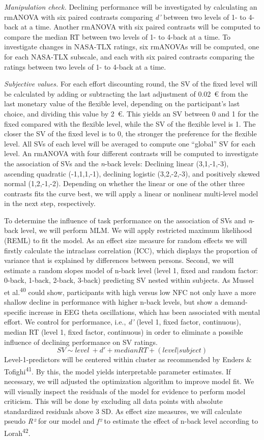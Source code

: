 \documentclass[
  man,floatsintext]{apa6}
\begin{document}
\emph{Manipulation check.}
Declining performance will be investigated by calculating an rmANOVA with six paired contrasts comparing \emph{d'} between two levels of 1- to 4-back at a time.
Another rmANOVA with six paired contrasts will be computed to compare the median RT between two levels of 1- to 4-back at a time.
To investigate changes in NASA-TLX ratings, six rmANOVAs will be computed, one for each NASA-TLX subscale, and each with six paired contrasts comparing the ratings between two levels of 1- to 4-back at a time.

\emph{Subjective values.}
For each effort discounting round, the SV of the fixed level will be calculated by adding or subtracting the last adjustment of 0.02~€ from the last monetary value of the flexible level, depending on the participant's last choice, and dividing this value by 2~€.
This yields an SV between 0 and 1 for the fixed compared with the flexible level, while the SV of the flexible level is 1.
The closer the SV of the fixed level is to 0, the stronger the preference for the flexible level.
All SVs of each level will be averaged to compute one ``global'' SV for each level.
An rmANOVA with four different contrasts will be computed to investigate the association of SVs and the \emph{n}-back levels: Declining linear (3,1,-1,-3), ascending quadratic (-1,1,1,-1), declining logistic (3,2,-2,-3), and positively skewed normal (1,2,-1,-2).
Depending on whether the linear or one of the other three contrasts fits the curve best, we will apply a linear or nonlinear multi-level model in the next step, respectively.

To determine the influence of task performance on the association of SVs and \emph{n}-back level, we will perform MLM.
We will apply restricted maximum likelihood (REML) to fit the model.
As an effect size measure for random effects we will firstly calculate the intraclass correlation (ICC), which displays the proportion of variance that is explained by differences between persons.
Second, we will estimate a random slopes model of n-back level (level 1, fixed and random factor: 0-back, 1-back, 2-back, 3-back) predicting SV nested within subjects.
As Mussel et al.\textsuperscript{40} could show, participants with high versus low NFC not only have a more shallow decline in performance with higher n-back levels, but show a demand-specific increase in EEG theta oscillations, which has been associated with mental effort.
We control for performance, i.e., \emph{d'} (level 1, fixed factor, continuous), median RT (level 1, fixed factor, continuous) in order to eliminate a possible influence of declining performance on SV ratings.
\[
SV \sim level\ + d' + median RT + (level|subject)
\]
Level-1-predictors will be centered within cluster as recommended by Enders \& Tofighi\textsuperscript{41}.
By this, the model yields interpretable parameter estimates.
If necessary, we will adjusted the optimization algorithm to improve model fit.
We will visually inspect the residuals of the model for evidence to perform model criticism.
This will be done by excluding all data points with absolute standardized residuals above 3 SD.
As effect size measures, we will calculate pseudo \emph{R²} for our model and \emph{f²} to estimate the effect of n-back level according to Lorah\textsuperscript{42}.
\end{document}
